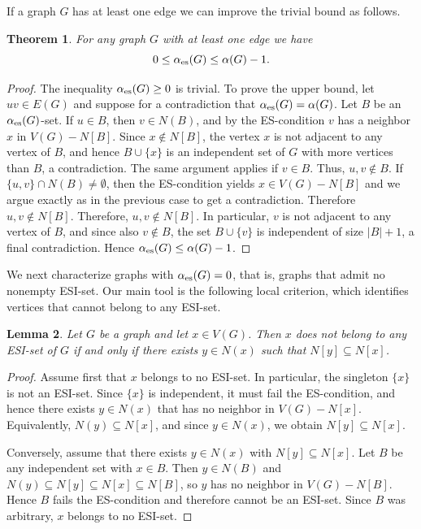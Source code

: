 \documentclass[11pt]{article}
\newtheorem{theorem}{Theorem}
\newtheorem{lemma}[theorem]{Lemma}
\newcommand{\es}{\alpha_{\rm es}}
\newcommand{\al}{\alpha}
\begin{document}
\medskip

If a graph $G$ has at least one edge we can improve the trivial bound as follows.

\begin{theorem} 
\label{alpha_up_bound}
For any graph $G$ with at least one edge we have 
$$0\leq\es(G)\leq\al(G)-1.$$
\end{theorem}

\begin{proof}
The inequality $\es(G)\ge 0$ is trivial. To prove the upper bound, let $uv\in E(G)$ and suppose for a contradiction that $\es(G)=\al(G)$. Let $B$ be an $\es(G)$-set. If $u\in B$, then $v\in N(B)$, and by the ES-condition $v$ has a neighbor $x$ in $V(G)-N[B]$. Since $x\notin N[B]$, the vertex $x$ is not adjacent to any
vertex of $B$, and hence $B\cup\{x\}$ is an independent set of $G$ with more vertices than $B$, a contradiction. The same argument applies if $v\in B$. 
Thus, $u,v\notin B$. If $\{u,v\}\cap N(B)\neq\emptyset$, then the ES-condition yields $x\in V(G)-N[B]$
and we argue exactly as in the previous case to get a contradiction. Therefore $u,v\notin N[B]$. Therefore, $u,v\notin N[B]$. In particular, $v$ is not adjacent to any vertex of $B$, and since also $v\notin B$, the set
$B\cup\{v\}$ is independent of size $|B|+1$, a final contradiction. Hence $\es(G)\le \al(G)-1$.
\end{proof}

We next characterize graphs with $\es(G)=0$, that is, graphs that admit no nonempty ESI-set. Our main tool is the following local criterion, which identifies vertices that cannot belong to any ESI-set.

\begin{lemma}
\label{notinESI}
Let $G$ be a graph and let $x\in V(G)$. Then  $x$ does not belong to any ESI-set of $G$ if and only if there exists $y\in N(x)$ such that $N[y]\subseteq N[x]$.
\end{lemma}

\begin{proof} 
Assume first that $x$ belongs to no ESI-set. In particular, the singleton $\{x\}$ is not an ESI-set. Since $\{x\}$ is independent, it must fail  the ES-condition, and hence there exists $y\in N(x)$ that has no neighbor in $V(G)-N[x]$. Equivalently, $N(y)\subseteq N[x]$, and since $y\in N(x)$, we obtain $N[y]\subseteq N[x]$.

Conversely, assume that there exists $y\in N(x)$ with $N[y]\subseteq N[x]$.
Let $B$ be any independent set with $x\in B$. Then $y\in N(B)$ and $N(y)\subseteq N[y]\subseteq N[x]\subseteq N[B]$, so $y$ has no neighbor in $V(G)-N[B]$. Hence $B$ fails the ES-condition and therefore
cannot be an ESI-set. Since $B$ was arbitrary, $x$ belongs to no ESI-set.
\end{proof}
\end{document}
